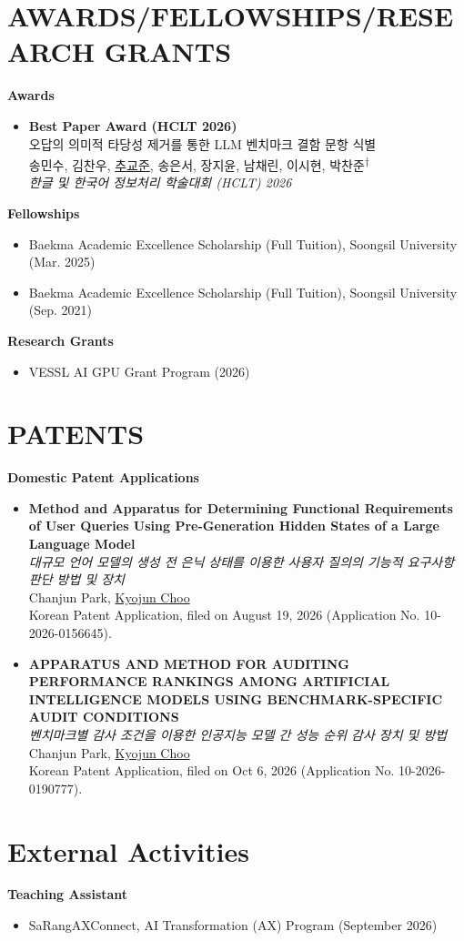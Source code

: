 \documentclass[10pt,a4paper]{article} %
\newcommand{\seclabel}[1]{\section*{\uppercase{#1}}}
\begin{document}
\seclabel{Awards/Fellowships/Research Grants}


\noindent\textbf{Awards}

\begin{itemize}[left=0pt]
    \item \small{
    \textbf{Best Paper Award (HCLT 2026)} \\
    오답의 의미적 타당성 제거를 통한 LLM 벤치마크 결함 문항 식별 \\
    송민수, 김찬우, \underline{추교준}, 송은서, 장지윤, 남채린, 이시현, 박찬준\textsuperscript{$\dagger$} \\
    \textit{한글 및 한국어 정보처리 학술대회 (HCLT) 2026}
    }
\end{itemize}
\vspace{1.0 em}

\noindent\textbf{Fellowships}
\begin{itemize}
    \item \small Baekma Academic Excellence Scholarship (Full Tuition), Soongsil University (Mar. 2025)
    \item \small Baekma Academic Excellence Scholarship (Full Tuition), Soongsil University (Sep. 2021)
\end{itemize}

\noindent\textbf{Research Grants}
\begin{itemize}
    \item \small VESSL AI GPU Grant Program (2026)
\end{itemize}

\seclabel{Patents}

\noindent\textbf{Domestic Patent Applications}
\begin{itemize}[left=0pt]
    \item \textbf{Method and Apparatus for Determining Functional Requirements of User Queries Using Pre-Generation Hidden States of a Large Language Model} \\
    \textit{대규모 언어 모델의 생성 전 은닉 상태를 이용한 사용자 질의의 기능적 요구사항 판단 방법 및 장치} \\
    Chanjun Park, \underline{Kyojun Choo} \\
    Korean Patent Application, filed on August 19, 2026 (Application No. 10-2026-0156645).

    \item \textbf{APPARATUS AND METHOD FOR AUDITING PERFORMANCE RANKINGS AMONG ARTIFICIAL INTELLIGENCE MODELS USING BENCHMARK-SPECIFIC AUDIT CONDITIONS} \\
    \textit{벤치마크별 감사 조건을 이용한 인공지능 모델 간 성능 순위 감사 장치 및 방법} \\
    Chanjun Park, \underline{Kyojun Choo} \\
    Korean Patent Application, filed on Oct 6, 2026 (Application No. 10-2026-0190777).
\end{itemize}

\section{External Activities}

\textbf{Teaching Assistant}
\begin{itemize}[left=0pt]
    \item \small{SaRangAXConnect, AI Transformation (AX) Program (September 2026)}
\end{itemize}
\vspace{0.4em}
\end{document}
